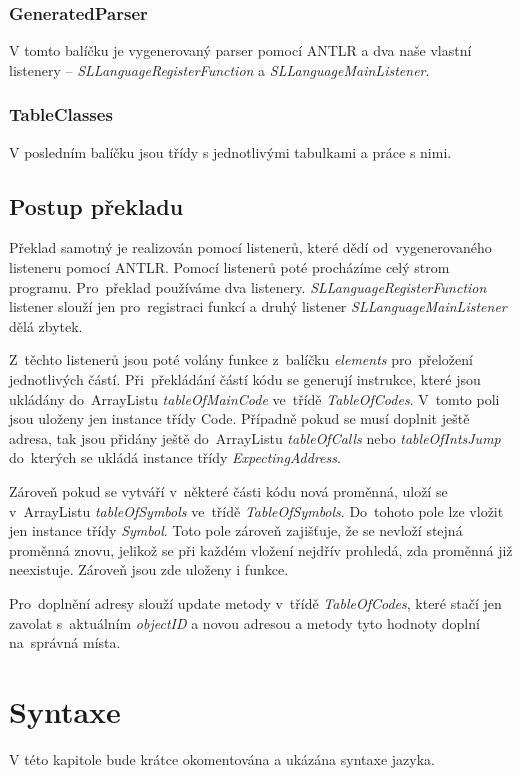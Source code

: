 \documentclass[czech]{thesiskiv}
\begin{document}
\subsection{GeneratedParser}
V tomto balíčku je vygenerovaný parser pomocí ANTLR a dva naše vlastní listenery – \textit{SLLanguageRegisterFunction} a \textit{SLLanguageMainListener}.

\subsection{TableClasses}
V posledním balíčku jsou třídy s jednotlivými tabulkami a práce s nimi. 


\section{Postup překladu}
Překlad samotný je realizován pomocí listenerů, které dědí od~vygenerovaného listeneru 
pomocí ANTLR. Pomocí listenerů poté procházíme celý strom programu. Pro~překlad používáme dva listenery. 
\textit{SLLanguageRegisterFunction} listener slouží jen pro~registraci funkcí a druhý listener \textit{SLLanguageMainListener} dělá zbytek. 


Z~těchto listenerů jsou poté volány funkce z~balíčku \textit{elements} pro~přeložení jednotlivých částí. 
Při~překládání částí kódu se generují instrukce, které jsou ukládány do~ArrayListu \textit{tableOfMainCode} ve~třídě \textit{TableOfCodes}. 
V~tomto poli jsou uloženy jen instance třídy Code. Případně pokud se musí doplnit ještě adresa, tak jsou přidány ještě
do~ArrayListu \textit{tableOfCalls} nebo \textit{tableOfIntsJump} do~kterých se ukládá instance třídy \textit{ExpectingAddress}.


Zároveň pokud se vytváří v~některé části kódu nová proměnná, uloží se v~ArrayListu \textit{tableOfSymbols} ve~třídě \textit{TableOfSymbols}. 
Do~tohoto pole lze vložit jen instance třídy \textit{Symbol}. Toto pole zároveň zajišťuje, že se nevloží 
stejná proměnná znovu, jelikož se při každém vložení nejdřív prohledá, zda proměnná již neexistuje. Zároveň jsou zde uloženy i funkce.


Pro~doplnění adresy slouží update metody v~třídě \textit{TableOfCodes}, které stačí jen zavolat s~aktuálním 
\textit{objectID} a novou adresou a metody tyto hodnoty doplní na~správná místa.


\chapter{Syntaxe}
V této kapitole bude krátce okomentována a ukázána syntaxe jazyka.
 
\end{document}

